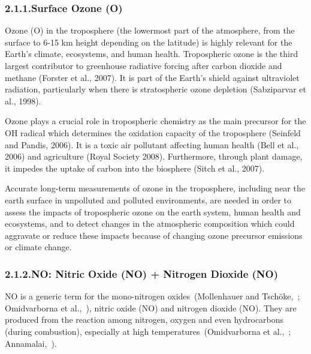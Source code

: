 \documentclass[9pt]{report}
\begin{document}
\subsubsection{2.1.1.\hspace*{0.5em}Surface Ozone (O)}\label{sec-surface-ozone-o3}%

\noindent{}Ozone (O) in the troposphere (the lowermost part of the atmosphere, from the surface to 6-15 km height depending on the latitude) is highly relevant for the Earth’s climate, ecosystems, and human health.
Tropospheric ozone is the third largest contributor to greenhouse radiative forcing after carbon dioxide and methane (Forster et al., 2007).
It is part of the Earth’s shield against ultraviolet radiation, particularly when there is stratospheric ozone depletion (Sabziparvar et al., 1998).%

Ozone plays a crucial role in tropospheric chemistry as the main precursor for the OH radical which determines the oxidation capacity of the troposphere (Seinfeld and Pandis, 2006). 
It is a toxic air pollutant affecting human health (Bell et al., 2006) and agriculture (Royal Society 2008).
Furthermore, through plant damage, it impedes the uptake of carbon into the biosphere (Sitch et al., 2007).%

Accurate long-term measurements of ozone in the troposphere, including near the earth surface in unpolluted and polluted environments, are needed in order to assess the impacts of tropospheric ozone on the earth system, human health and ecosystems, and to detect changes in the atmospheric composition which could aggravate or reduce these impacts because of changing ozone precursor emissions or climate change.%

\subsubsection{2.1.2.\hspace*{0.5em}NO: Nitric Oxide (NO) + Nitrogen Dioxide (NO)}\label{sec-nox--nitric-oxide-no-nitrogen-dioxide-no2}%

\noindent{}NO is a generic term for the mono-nitrogen oxides~(Mollenhauer and Tschöke,~; Omidvarborna et al.,~), nitric oxide (NO) and nitrogen dioxide (NO).
They are produced from the reaction among nitrogen, oxygen and even hydrocarbons (during combustion), especially at high temperatures~(Omidvarborna et al.,~; Annamalai,~).%
\end{document}
